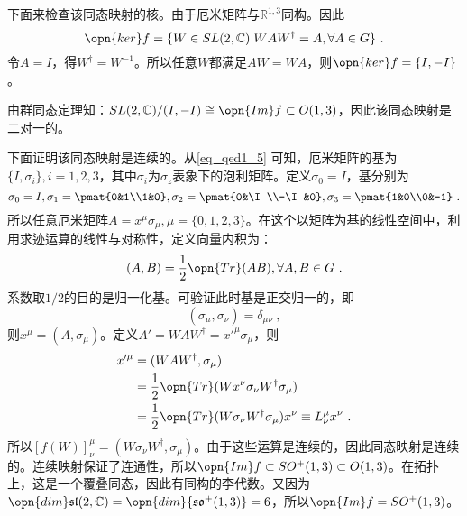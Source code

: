 下面来检查该同态映射的核。由于厄米矩阵与$\mathbb R^{1,3}$同构。因此
\begin{equation}
\opn{ker} f=\{W\in SL(2,\mathbb C)|WAW^{\dagger}=A,\forall A\in G \}~.
\end{equation}
令$A=I$，得$W^{\dagger}=W^{-1}$。所以任意$W$都满足$AW=WA$，则$\opn{ker} f=\{I,-I\}$。

由群同态定理知：$SL(2,\mathbb C)/(I,-I)\cong \opn{Im}f\subset O(1,3)$，因此该同态映射是二对一的。

下面证明该同态映射是连续的。从\autoref{eq_qed1_5} 可知，厄米矩阵的基为$\{I,\sigma_i\},i=1,2,3$，其中$\sigma_i$为$\sigma_z$表象下的泡利矩阵。定义$\sigma_0=I$，基分别为
\begin{equation}
\sigma_0=I,\sigma_1=\pmat{0&1\\1&0},\sigma_2=\pmat{0&\I\\-\I&0},\sigma_3=\pmat{1&0\\0&-1}~.
\end{equation}
所以任意厄米矩阵$A=x^{\mu}\sigma_{\mu},\mu=\{0,1,2,3\}$。在这个以矩阵为基的线性空间中，利用求迹运算的线性与对称性，定义向量内积为：
\begin{equation}
(A,B)=\frac{1}{2}\opn{Tr}(AB),\forall A,B\in G~.
\end{equation}
系数取$1/2$的目的是归一化基。可验证此时基是正交归一的，即
\begin{equation}
(\sigma_{\mu},\sigma_{\nu})=\delta_{\mu\nu}~,
\end{equation}
则$x^{\mu}=(A,\sigma_{\mu})$。定义$A'=WAW^{\dagger}=x'^{\mu}\sigma_{\mu}$，则
\begin{equation}
\begin{aligned}
x'^{\mu}&=(WAW^{\dagger},\sigma
_{\mu})\\
&=\frac{1}{2}\opn{Tr}(Wx^{\nu}\sigma_{\nu}W^{\dagger}\sigma_{\mu})\\
&=\frac{1}{2}\opn{Tr}(W\sigma_{\nu}W^{\dagger}\sigma_{\mu})x^{\nu}\equiv L^{\mu}_{\nu}x^{\nu}~.
\end{aligned}
\end{equation}
所以$[f(W)]^{\mu}_{\nu}=(W\sigma_{\nu}W^{\dagger},\sigma_{\mu})$。由于这些运算是连续的，因此同态映射是连续的。连续映射保证了连通性，所以$\opn{Im}f\subset SO^+(1,3)\subset O(1,3)$。在拓扑上，这是一个覆叠同态，因此有同构的李代数。又因为$\opn{dim}\mathfrak {sl}(2,\mathbb C)=\opn{dim}{\mathfrak{so^+}(1,3)}=6$，所以$\opn{Im}f=SO^+(1,3)$。




